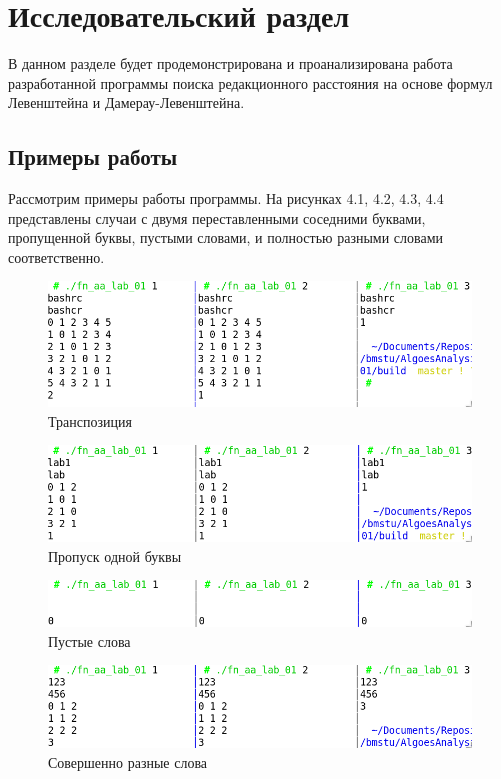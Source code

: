 \chapter{Исследовательский раздел}
\label{cha:research}

В данном разделе будет продемонстрирована и проанализирована работа разработанной программы поиска редакционного расстояния на основе формул Левенштейна и Дамерау-Левенштейна.

\section{Примеры работы}
Рассмотрим примеры работы программы. На рисунках 4.1, 4.2, 4.3, 4.4 представлены случаи с двумя переставленными соседними буквами, пропущенной буквы, пустыми словами, и полностью разными словами соответственно.

\begin{figure}[H]
    \centering
    \includegraphics[scale=0.5]{./pics/t1.png}
    \caption{Транспозиция}
\end{figure}
\begin{figure}[H]
    \centering
    \includegraphics[scale=0.5]{./pics/t2.png}
    \caption{Пропуск одной буквы}
\end{figure}
\begin{figure}[H]
    \centering
    \includegraphics[scale=0.5]{./pics/t3.png}
    \caption{Пустые слова}
\end{figure}
\begin{figure}[H]
    \centering
    \includegraphics[scale=0.5]{./pics/t4.png}
    \caption{Совершенно разные слова}
\end{figure}

